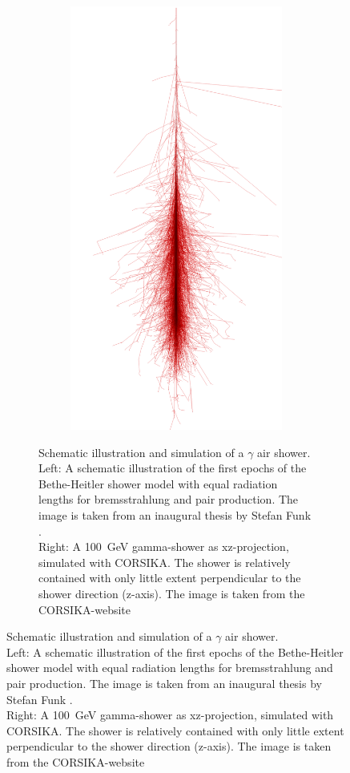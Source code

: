 \begin{figure}
\begin{figure}
\begin{subfigure}{.2\textwidth}
		\includegraphics[width=\linewidth]{images/corsika_100gev_photon.png}
	\end{subfigure}
	\caption{Schematic illustration and simulation of a $\gamma$ air shower. \\
		Left: A schematic illustration of the first epochs of the 
		Bethe-Heitler shower model with equal radiation lengths for
		bremsstrahlung and pair production.
		The image is taken from an inaugural thesis 
		by Stefan Funk \cite{funk_doctor}. \\
		Right: A \SI{100}{\giga\electronvolt} gamma-shower as xz-projection, simulated with CORSIKA.
		The shower is relatively contained with only little extent perpendicular 
		to the shower direction (z-axis). The image is taken from 
		the CORSIKA-website \cite{corsika_showers}}
	\label{fig:gamma_shower}
\end{figure}


\end{figure}
